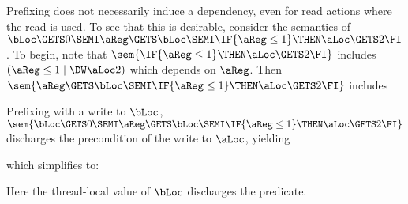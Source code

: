 Prefixing does not necessarily induce a
dependency, even for read actions where the read is used.  To see that this
is desirable, consider  the semantics of
$\bLoc\GETS0\SEMI\aReg\GETS\bLoc\SEMI\IF{\aReg\leq1}\THEN \aLoc\GETS 2\FI$.
To begin, note that 
$\sem{\IF{\aReg\leq1}\THEN \aLoc\GETS 2\FI}$ includes
$(\aReg\leq1 \mid \DW\aLoc2)$
which depends on $\aReg$.
Then $\sem{\aReg\GETS\bLoc\SEMI\IF{\aReg\leq1}\THEN \aLoc\GETS 2\FI}$ includes
\begin{tikzdisplay}[node distance=1em]
\end{tikzdisplay}
Prefixing with a write to $\bLoc$, $\sem{\bLoc\GETS0\SEMI\aReg\GETS\bLoc\SEMI\IF{\aReg\leq1}\THEN \aLoc\GETS
  2\FI}$ discharges the precondition of the write to $\aLoc$, yielding
\begin{tikzdisplay}[node distance=1em]
\end{tikzdisplay}
which simplifies to:
\begin{tikzdisplay}[node distance=1em]
\end{tikzdisplay}
Here the thread-local value of $\bLoc$ discharges the predicate.


